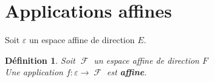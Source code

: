 \documentclass[a4paper, oneside]{report}
\theoremstyle{break}
\newtheorem{definition}[thm]{Définition}
\DeclareMathOperator{\F}{\mathcal{F}}
\newcommand{\slign}{\textbf}
\newcommand{\ensF}{\F}
\begin{document}
\section{Applications affines}

Soit $\varepsilon$ un espace affine de direction $E$.

\begin{definition}
Soit $\ensF$ un espace affine de direction $F$\\
Une application $f : \varepsilon \rightarrow \ensF$ est \slign{affine}.
\end{definition}
\end{document}

